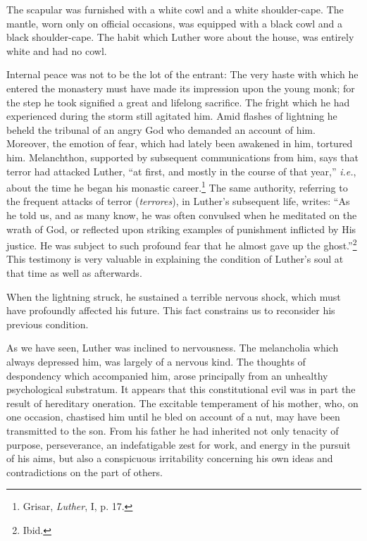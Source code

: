 The scapular was furnished with a white cowl and a white shoulder-cape. The mantle, worn only on official occasions, was equipped with
a black cowl and a black shoulder-cape. The habit which Luther
wore about the house, was entirely white and had no cowl.

Internal peace was not to be the lot of the entrant: The very haste
with which he entered the monastery must have made its impression
upon the young monk; for the step he took signified a great and
lifelong sacrifice. The fright which he had experienced during the
storm still agitated him. Amid flashes of lightning he beheld the
tribunal of an angry God who demanded an account of him. Moreover,
the emotion of fear, which had lately been awakened in him,
tortured him. Melanchthon, supported by subsequent communications
from him, says that terror had attacked Luther, “at first, and
mostly in the course of that year,” \textit{i.e.}, about the time he began his monastic career.\footnote
{Grisar, \textit{Luther}, I, p. 17.}
The same authority, referring to the frequent attacks of terror (\textit{terrores}), in Luther’s
subsequent life, writes: “As he told us, and as many know, he was often
convulsed when he meditated on the wrath of God, or reflected upon striking
examples of punishment inflicted by His justice. He was subject to such
profound fear that he almost gave up the ghost.”\footnote{Ibid.}
This testimony is very valuable in explaining the condition of Luther’s soul at that time as well as afterwards.

When the lightning struck, he sustained a terrible nervous shock, which must have profoundly affected his future.
This fact constrains us to reconsider his previous condition.

As we have seen, Luther was inclined to nervousness. The melancholia
which always depressed him, was largely of a nervous kind. The thoughts
of despondency which accompanied him, arose principally from an unhealthy
psychological substratum. It appears that this constitutional evil was
in part the result of hereditary oneration. The excitable temperament of
his mother, who, on one occasion, chastised him until he bled on account of a nut, may have
been transmitted to the son. From his father he had inherited not
only tenacity of purpose, perseverance, an indefatigable zest for
work, and energy in the pursuit of his aims, but also a conspicuous
irritability concerning his own ideas and contradictions on the part
of others.

